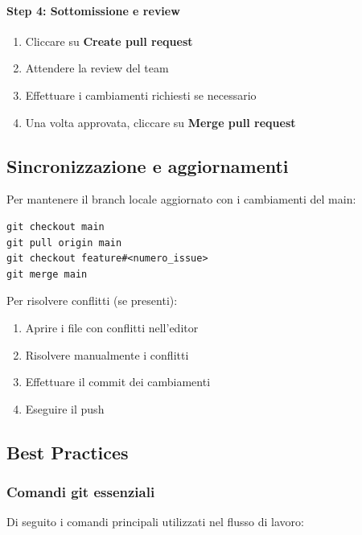 \paragraph{Step 4: Sottomissione e review}
\begin{enumerate}
  \item Cliccare su \textbf{Create pull request}
  \item Attendere la review del team
  \item Effettuare i cambiamenti richiesti se necessario
  \item Una volta approvata, cliccare su \textbf{Merge pull request}
\end{enumerate}

\subsection{Sincronizzazione e aggiornamenti}

Per mantenere il branch locale aggiornato con i cambiamenti del main:

\begin{verbatim}
git checkout main
git pull origin main
git checkout feature#<numero_issue>
git merge main
\end{verbatim}

Per risolvere conflitti (se presenti):
\begin{enumerate}
  \item Aprire i file con conflitti nell'editor
  \item Risolvere manualmente i conflitti
  \item Effettuare il commit dei cambiamenti
  \item Eseguire il push
\end{enumerate}

\subsection{Best Practices}

\subsubsection{Comandi git essenziali}

Di seguito i comandi principali utilizzati nel flusso di lavoro:


